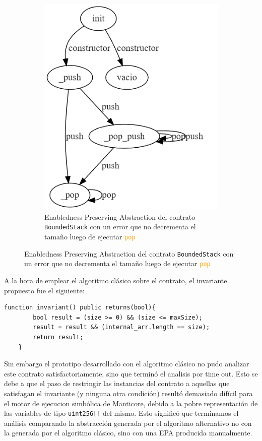 \begin{figure}[H]
    \centering
    \begin{subfigure}{0.45\textwidth}
        \includegraphics[width=\textwidth]{figs/buggy-bounded-stack-epa.png}
        \caption{Enabledness Preserving Abstraction del contrato \texttt{BoundedStack} con un error que no decrementa el tamaño luego de ejecutar \textcolor{orange}{\texttt{pop}} }
        \label{fig:buggy-bounded-stack-epa}
    \end{subfigure}
\end{figure}

A la hora de emplear el algoritmo clásico sobre el contrato, el invariante propuesto fue el siguiente:
\begin{lstlisting}[language=Solidity]
    function invariant() public returns(bool){
        bool result = (size >= 0) && (size <= maxSize);
        result = result && (internal_arr.length == size);
        return result;
    }
\end{lstlisting}
Sin embargo el prototipo desarrollado con el algoritmo clásico no pudo analizar este contrato satisfactoriamente, sino que terminó el analisis por time out.
Esto se debe a que el paso de restringir las instancias del contrato a aquellas que satisfagan el invariante (y ninguna otra condición) resultó demasiado difícil para el motor de ejecucion simbólica de Manticore, debido a la pobre representación de las variables de tipo \texttt{uint256[]} del mismo.
Esto significó que terminamos el análisis comparando la abstracción generada por el algoritmo alternativo no con la generada por el algoritmo clásico, sino con una EPA producida manualmente.

